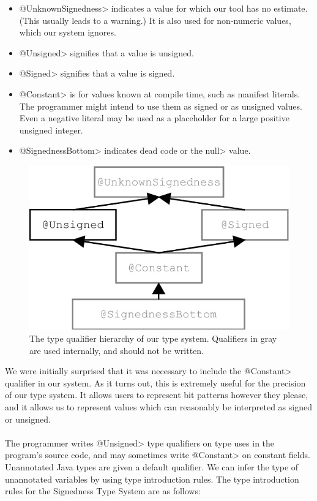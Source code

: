 \begin{itemize}
  \item \<@UnknownSignedness> indicates a value for which our tool
   has no estimate.  (This usually leads to a
    warning.)  It is also used for non-numeric
    values, which our system ignores.
  \item \<@Unsigned> signifies that a value is unsigned.
  \item \<@Signed> signifies that a value is signed.
  \item \<@Constant> is for values known at compile time, such as
    manifest literals.  The programmer might intend to
    use them as signed or as unsigned values.  Even a negative literal may
    be used as a placeholder for a large positive unsigned
    integer.
  \item \<@SignednessBottom> indicates dead code or the \<null> value.
\end{itemize}

\begin{figure}[t]
\centering
\includegraphics{signedness}
\caption{The type qualifier hierarchy of our type system.
Qualifiers in gray are used internally, and should not be written.}
\label{fig:type-hierarchy}
\end{figure}

We were initially surprised that it was necessary to include the \<@Constant>
qualifier in our system. As it turns out, this is extremely useful for the
precision of our type system. It allows users to represent bit patterns
however they please, and it allows us to represent values which can
reasonably be interpreted as signed or unsigned.\\
\\
The programmer writes \<@Unsigned> type qualifiers on type uses
in the program's source code, and may sometimes write \<@Constant> on
constant fields.  Unannotated Java types
are given a default qualifier. We can infer the type of unannotated variables
by using type introduction rules. The type introduction rules for the
Signedness Type System are as follows:


